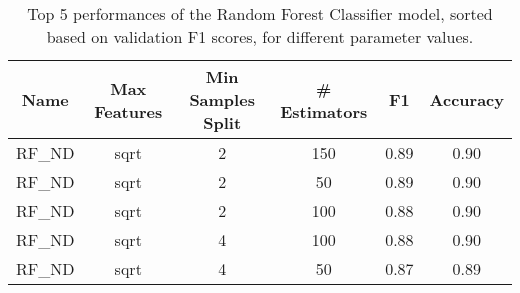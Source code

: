 \begin{table}[H]
	\centering
	\begin{tabular}{c c c c c c}
	\hline
	\hline
	\textbf{Name} & \textbf{Max Features} & \textbf{Min Samples Split} & \textbf{\# Estimators} & \textbf{F1} & \textbf{Accuracy} \\
	\hline
	\hline
	RF\_ND & sqrt & 2 & 150 & 0.89 & 0.90 \\
	RF\_ND & sqrt & 2 & 50 & 0.89 & 0.90 \\
	RF\_ND & sqrt & 2 & 100 & 0.88 & 0.90 \\
	RF\_ND & sqrt & 4 & 100 & 0.88 & 0.90 \\
	RF\_ND & sqrt & 4 & 50 & 0.87 & 0.89 \\
	\hline
	\end{tabular}

	\caption{Top 5 performances of the Random Forest Classifier model, sorted based on validation F1 scores, for different parameter values.}
	\label{tab:rf}
\end{table}

